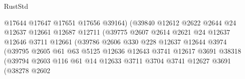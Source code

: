 \begin{lexlean}{RustStd}
\begin{coremodule}
                                      @17644
                                      @17647
                                      @17651
                                      @17656
                                      @39164)
                                    (@39840
                                      @12612
                                      @2622
                                      @2644
                                      @24
                                      @12637
                                      @12661
                                      @12687
                                      @12711
                                      (@39775
                                        @2607
                                        @2614
                                        @2621
                                        @24
                                        @12637
                                        @12646
                                        @3711
                                        @12661
                                        (@39786
                                          @2606
                                          @330
                                          @228
                                          @12637
                                          @12644
                                          @3974
                                          (@39795
                                            @2605
                                            @61
                                            @63
                                            @5125
                                            @12636
                                            @12643
                                            @3741
                                            @12617
                                            @3691
                                            @38318
                                            (@39794
                                              @2603
                                              @116
                                              @61
                                              @14
                                              @12633
                                              @3711
                                              @3704
                                              @3741
                                              @12627
                                              @3691
                                              (@38278
                                                @2602

\end{coremodule}
\end{lexlean}
